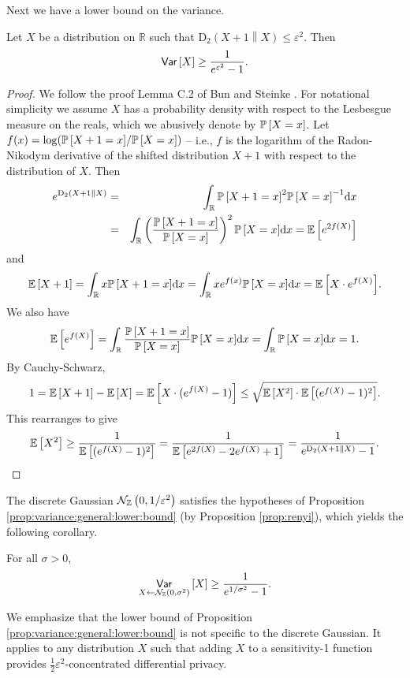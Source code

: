 \documentclass{jpcfinal} %
\newcommand{\dgausss}[2]{{\discN\left(#1,#2\right)}}
\newcommand{\dgauss}[1]{\dgausss{0}{#1}}
\newcommand{\ex}[2]{{\ifx&#1& \mathbb{E} \else
\underset{#1}{\mathbb{E}} \fi \left[#2\right]}}
\newcommand{\pr}[2]{{\ifx&#1& \mathbb{P} \else
\underset{#1}{\mathbb{P}} \fi \left[#2\right]}}
\newcommand{\var}[2]{{\ifx&#1& \mathsf{Var} \else
\underset{#1}{\mathsf{Var}} \fi \left[#2\right]}}
\newcommand{\dr}[3]{\mathrm{D}_{#1}\left(#2\middle\|#3\right)}
\newcommand{\R}{\mathbb{R}}
\begin{document}
Next we have a lower bound on the variance. 

\begin{prop}\label{prop:variance:general:lower:bound}
Let $X$ be a distribution on $\R$ such that $\dr{2}{X+1}{X} \le \varepsilon^2$. Then
\begin{equation}
    \var{}{X} \geq \frac{1}{e^{\varepsilon^2}-1}.
\end{equation}
\end{prop}
\begin{proof}
We follow the proof Lemma C.2 of Bun and Steinke \cite{BunS16}. For notational simplicity we assume $X$ has a probability density with respect to the Lesbesgue measure on the reals, which we abusively denote by $\pr{}{X=x}$. Let $f(x)=\log(\pr{}{X+1=x}/\pr{}{X=x})$ -- i.e., $f$ is the logarithm of the Radon-Nikodym derivative of the shifted distribution $X+1$ with respect to the distribution of $X$. Then
%
\begin{eqnarray*}
e^{\dr{2}{X+1}{X}} & = & \int_\R \pr{}{X+1=x}^2 \pr{}{X=x}^{-1} \mathrm{d}x \\
                   & = & \int_\R \left(\frac{\pr{}{X+1=x}}{\pr{}{X=x}}\right)^2 \pr{}{X=x} \mathrm{d}x = \ex{}{e^{2f(X)}}
\end{eqnarray*}
%
and $$\ex{}{X+1} = \int_\R x \pr{}{X+1=x} \mathrm{d}x = \int_\R x e^{f(x)} \pr{}{X=x} \mathrm{d}x = \ex{}{X \cdot e^{f(X)}}.$$
We also have $$\ex{}{e^{f(X)}} = \int_\R \frac{\pr{}{X+1=x}}{\pr{}{X=x}} \pr{}{X=x} \mathrm{d}x = \int_\R \pr{}{X=x} \mathrm{d}x = 1.$$
By Cauchy-Schwarz, $$1=\ex{}{X+1}-\ex{}{X} = \ex{}{X \cdot (e^{f(X)}-1)} \le \sqrt{\ex{}{X^2} \cdot \ex{}{(e^{f(X)}-1)^2}}.$$
This rearranges to give
$$\ex{}{X^2} \ge \frac{1}{\ex{}{(e^{f(X)}-1)^2}} = \frac{1}{\ex{}{e^{2f(X)}-2e^{f(X)}+1}}=\frac{1}{e^{\dr{2}{X+1}{X}}-1}.$$
\end{proof}

The discrete Gaussian $\dgauss{1/\varepsilon^2}$ satisfies the hypotheses of Proposition \ref{prop:variance:general:lower:bound} (by Proposition \ref{prop:renyi}), which yields the following corollary.
\begin{cor}\label{cor:dgauss_var}
For all $\sigma>0$, 
\begin{equation}
    \var{X \gets \dgauss{\sigma^2}}{X} \ge \frac{1}{e^{1/\sigma^2}-1}.
\end{equation}
\end{cor}
We emphasize that the lower bound of Proposition \ref{prop:variance:general:lower:bound} is not specific to the discrete Gaussian. It applies to any distribution $X$ such that adding $X$ to a sensitivity-1 function provides $\frac12\varepsilon^2$-concentrated differential privacy.
\end{document}

